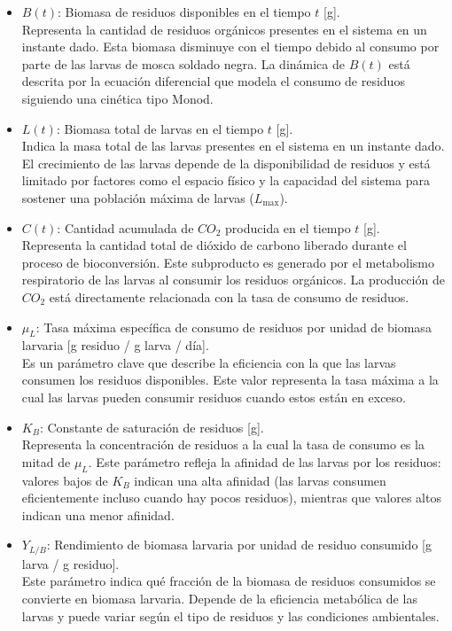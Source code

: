 \documentclass[12pt]{article}
\begin{document}
\begin{itemize}
    \item $B(t)$: Biomasa de residuos disponibles en el tiempo $t$ [g]. \\
    Representa la cantidad de residuos orgánicos presentes en el sistema en un instante dado. Esta biomasa disminuye con el tiempo debido al consumo por parte de las larvas de mosca soldado negra. La dinámica de $B(t)$ está descrita por la ecuación diferencial que modela el consumo de residuos siguiendo una cinética tipo Monod.

    \item $L(t)$: Biomasa total de larvas en el tiempo $t$ [g]. \\
    Indica la masa total de las larvas presentes en el sistema en un instante dado. El crecimiento de las larvas depende de la disponibilidad de residuos y está limitado por factores como el espacio físico y la capacidad del sistema para sostener una población máxima de larvas ($L_{\text{max}}$).

    \item $C(t)$: Cantidad acumulada de $CO_2$ producida en el tiempo $t$ [g]. \\
    Representa la cantidad total de dióxido de carbono liberado durante el proceso de bioconversión. Este subproducto es generado por el metabolismo respiratorio de las larvas al consumir los residuos orgánicos. La producción de $CO_2$ está directamente relacionada con la tasa de consumo de residuos.

    \item $\mu_L$: Tasa máxima específica de consumo de residuos por unidad de biomasa larvaria [g residuo / g larva / día]. \\
    Es un parámetro clave que describe la eficiencia con la que las larvas consumen los residuos disponibles. Este valor representa la tasa máxima a la cual las larvas pueden consumir residuos cuando estos están en exceso.

    \item $K_B$: Constante de saturación de residuos [g]. \\
    Representa la concentración de residuos a la cual la tasa de consumo es la mitad de $\mu_L$. Este parámetro refleja la afinidad de las larvas por los residuos: valores bajos de $K_B$ indican una alta afinidad (las larvas consumen eficientemente incluso cuando hay pocos residuos), mientras que valores altos indican una menor afinidad.

    \item $Y_{L/B}$: Rendimiento de biomasa larvaria por unidad de residuo consumido [g larva / g residuo]. \\
    Este parámetro indica qué fracción de la biomasa de residuos consumidos se convierte en biomasa larvaria. Depende de la eficiencia metabólica de las larvas y puede variar según el tipo de residuos y las condiciones ambientales.


\end{itemize}
\end{document}

